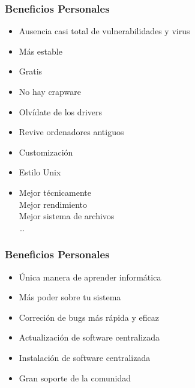 \documentclass{beamer}
\begin{document}
\begin{frame}\frametitle{Beneficios Personales}
    \begin{itemize}
        \item Ausencia casi total de vulnerabilidades y virus
        \item Más estable
        \item Gratis
        \item No hay crapware
        \item Olvídate de los drivers
        \item Revive ordenadores antiguos
        \item Customización
        \item Estilo Unix
        \item Mejor técnicamente \\
            Mejor rendimiento \\ 
            Mejor sistema de archivos \\
            \ldots 
    \end{itemize}
\end{frame}

\begin{frame}\frametitle{Beneficios Personales}
    \begin{itemize}
        \item Única manera de aprender informática 
        \item Más poder sobre tu sistema
        \item Correción de bugs más rápida y eficaz
        \item Actualización de software centralizada
        \item Instalación de software centralizada
        \item Gran soporte de la comunidad
    \end{itemize}
\end{frame}
\end{document}
